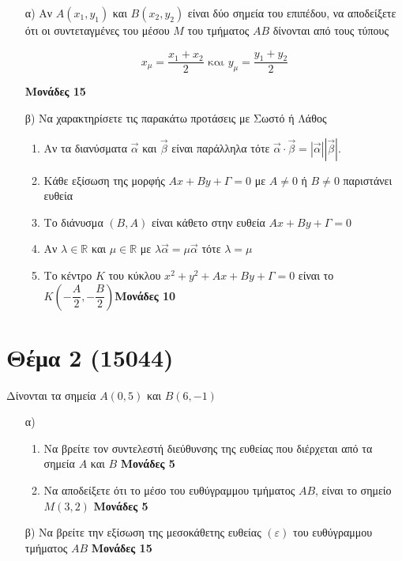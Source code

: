 \documentclass[12pt]{extarticle}
\begin{document}
\begin{enumerate}
    \item[α)] Αν $Α(x_1,y_1)$ και $Β(x_2,y_2)$ είναι δύο σημεία του επιπέδου, να αποδείξετε ότι οι συντεταγμένες του μέσου $Μ$ του τμήματος $ΑΒ$ δίνονται από τους τύπους

        $$x_μ=\dfrac{x_1+x_2}{2} \text{ και } y_μ=\dfrac{y_1+y_2}{2}$$

        \hspace*{\fill} \textbf{Μονάδες 15}

    \item[β)] Να χαρακτηρίσετε τις παρακάτω προτάσεις με Σωστό ή Λάθος
        \begin{enumerate}
            \item Αν τα διανύσματα $\vec{α}$ και $\vec{β}$ είναι παράλληλα τότε $\vec{α}\cdot\vec{β}=|\vec{α}||\vec{β}|$.

            \item Κάθε εξίσωση της μορφής $Αx+Βy+Γ=0$ με $Α\ne0$ ή $Β\ne 0$ παριστάνει ευθεία
            \item Το διάνυσμα $(Β,Α)$ είναι κάθετο στην ευθεία $Αx+Βy+Γ=0$
            \item Αν $λ\in\mathbb{R}$ και $μ\in\mathbb{R}$ με $λ\vec{α}=μ\vec{α}$ τότε $λ=μ$
            \item Το κέντρο $Κ$ του κύκλου $x^2+y^2+Αx+Βy+Γ=0$ είναι το $Κ(-\dfrac{Α}{2},-\dfrac{Β}{2})$\hspace*{\fill}\textbf{Μονάδες 10}
        \end{enumerate}
\end{enumerate}

\section*{Θέμα 2 (15044)}
\noindent
Δίνονται τα σημεία $Α(0,5)$ και $Β(6,-1)$
\begin{enumerate}
    \item[α)]
        \begin{enumerate}
            \item Να βρείτε τον συντελεστή διεύθυνσης της ευθείας που διέρχεται από τα σημεία $Α$ και $Β$\hspace*{\fill} \textbf{Μονάδες 5}
            \item Να αποδείξετε ότι το μέσο του ευθύγραμμου τμήματος $ΑΒ$, είναι το σημείο $Μ(3,2)$\hspace*{\fill} \textbf{Μονάδες 5}
        \end{enumerate}
    \item[β)] Να βρείτε την εξίσωση της μεσοκάθετης ευθείας $(ε)$ του ευθύγραμμου τμήματος $ΑΒ$ \hspace*{\fill} \textbf{Μονάδες 15}
\end{enumerate}
\end{document}

